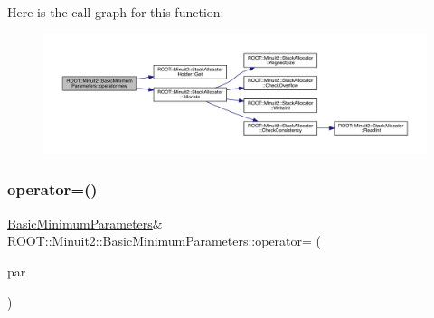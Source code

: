 Here is the call graph for this function\+:
\nopagebreak
\begin{figure}[H]
\begin{center}
\leavevmode
\includegraphics[width=350pt]{da/d30/classROOT_1_1Minuit2_1_1BasicMinimumParameters_a5258a9959c0b6ff699a9200dad4caee0_cgraph}
\end{center}
\end{figure}
\mbox{\label{classROOT_1_1Minuit2_1_1BasicMinimumParameters_a468d3eefd1f7080b499f090afdb3eab4}} 
\subsubsection{\texorpdfstring{operator=()}{operator=()}\hspace{0.1cm}{\footnotesize\ttfamily [1/2]}}
{\footnotesize\ttfamily \mbox{\hyperlink{classROOT_1_1Minuit2_1_1BasicMinimumParameters}{Basic\+Minimum\+Parameters}}\& R\+O\+O\+T\+::\+Minuit2\+::\+Basic\+Minimum\+Parameters\+::operator= (\begin{DoxyParamCaption}\item[{const \mbox{\hyperlink{classROOT_1_1Minuit2_1_1BasicMinimumParameters}{Basic\+Minimum\+Parameters}} \&}]{par }\end{DoxyParamCaption})\hspace{0.3cm}{\ttfamily [inline]}}

\mbox{\label{classROOT_1_1Minuit2_1_1BasicMinimumParameters_a468d3eefd1f7080b499f090afdb3eab4}} 
